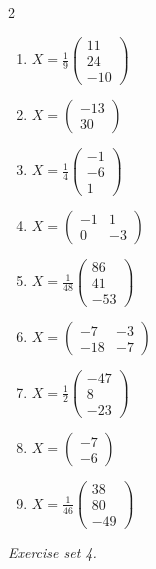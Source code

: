 \begin{multicols}{2}
\begin{enumerate}[label=\arabic*., leftmargin=*, itemsep=1pt]
\item $X=\frac{1}{9}\left(\begin{smallmatrix}11\\ 24\\ -10\end{smallmatrix}\right)$
\item $X=\left(\begin{smallmatrix}-13\\ 30\end{smallmatrix}\right)$
\item $X=\frac{1}{4}\left(\begin{smallmatrix}-1\\ -6\\ 1\end{smallmatrix}\right)$
\item $X=\left(\begin{smallmatrix}-1 & 1\\ 0 & -3\end{smallmatrix}\right)$
\item $X=\frac{1}{48}\left(\begin{smallmatrix}86\\ 41\\ -53\end{smallmatrix}\right)$
\item $X=\left(\begin{smallmatrix}-7 & -3\\ -18 & -7\end{smallmatrix}\right)$
\item $X=\frac{1}{2}\left(\begin{smallmatrix}-47\\ 8\\ -23\end{smallmatrix}\right)$
\item $X=\left(\begin{smallmatrix}-7\\ -6\end{smallmatrix}\right)$
\item $X=\frac{1}{46}\left(\begin{smallmatrix}38\\ 80\\ -49\end{smallmatrix}\right)$
\end{enumerate}
\end{multicols}
\par\noindent\emph{Exercise set 4.}\nopagebreak
